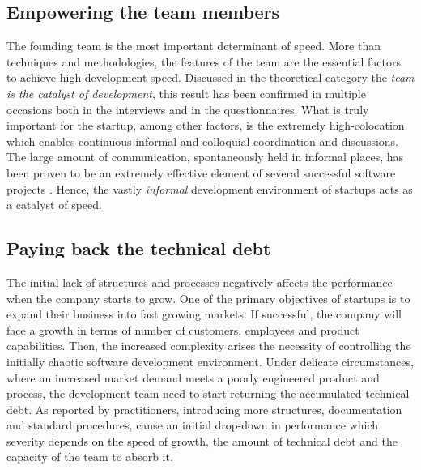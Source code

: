 \documentclass[10pt,journal,letterpaper,compsoc]{IEEEtran}
\begin{document}
\subsection{Empowering the team members}
The founding team is the most important determinant of speed. More than 
techniques and methodologies, the features of the team are the essential factors 
to achieve high-development speed. Discussed in the theoretical category the 
\textit{team is the catalyst of development}, this result has been confirmed in 
multiple occasions both in the interviews and in the questionnaires. What is 
truly important for the startup, among other factors, is the extremely 
high-colocation which enables continuous informal and colloquial coordination 
and discussions. 
The large amount of communication, spontaneously held in informal places, has 
been proven to be an extremely effective element of 
several successful software projects \cite{Highsmith2000}. Hence, the vastly 
\textit{informal} development environment of startups acts as a catalyst of 
speed.

\subsection{Paying back the technical debt}
The initial lack of structures and processes negatively affects the 
performance when the company starts to grow. One of the primary objectives of 
startups is to expand their business into fast growing markets. If 
successful, the company will face a growth in terms of number of customers, 
employees and product capabilities. Then, the increased complexity arises the 
necessity of controlling the initially chaotic software development environment. 
Under delicate circumstances, where an increased market demand meets a poorly 
engineered product and process, the development team need to start returning 
the accumulated technical debt. As reported by practitioners, introducing more 
structures, documentation and standard procedures, cause an initial drop-down in 
performance which severity depends on the speed of growth, the amount of 
technical debt and the capacity of the team to absorb it. 
\end{document}
